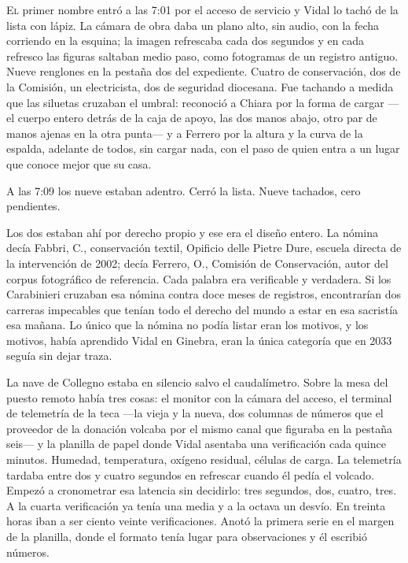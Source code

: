 \lettrine[lines=2, lhang=0.1, nindent=0.2em]{E}{l} primer nombre entró a las 7:01 por el acceso de servicio y Vidal lo tachó de la lista con lápiz. La cámara de obra daba un plano alto, sin audio, con la fecha corriendo en la esquina; la imagen refrescaba cada dos segundos y en cada refresco las figuras saltaban medio paso, como fotogramas de un registro antiguo. Nueve renglones en la pestaña dos del expediente. Cuatro de conservación, dos de la Comisión, un electricista, dos de seguridad diocesana. Fue tachando a medida que las siluetas cruzaban el umbral: reconoció a Chiara por la forma de cargar ---el cuerpo entero detrás de la caja de apoyo, las dos manos abajo, otro par de manos ajenas en la otra punta--- y a Ferrero por la altura y la curva de la espalda, adelante de todos, sin cargar nada, con el paso de quien entra a un lugar que conoce mejor que su casa.


A las 7:09 los nueve estaban adentro. Cerró la lista. Nueve tachados, cero pendientes.

Los dos estaban ahí por derecho propio y ese era el diseño entero. La nómina decía Fabbri, C., conservación textil, Opificio delle Pietre Dure, escuela directa de la intervención de 2002; decía Ferrero, O., Comisión de Conservación, autor del corpus fotográfico de referencia. Cada palabra era verificable y verdadera. Si los Carabinieri cruzaban esa nómina contra doce meses de registros, encontrarían dos carreras impecables que tenían todo el derecho del mundo a estar en esa sacristía esa mañana. Lo único que la nómina no podía listar eran los motivos, y los motivos, había aprendido Vidal en Ginebra, eran la única categoría que en 2033 seguía sin dejar traza.

La nave de Collegno estaba en silencio salvo el caudalímetro. Sobre la mesa del puesto remoto había tres cosas: el monitor con la cámara del acceso, el terminal de telemetría de la teca ---la vieja y la nueva, dos columnas de números que el proveedor de la donación volcaba por el mismo canal que figuraba en la pestaña seis--- y la planilla de papel donde Vidal asentaba una verificación cada quince minutos. Humedad, temperatura, oxígeno residual, células de carga. La telemetría tardaba entre dos y cuatro segundos en refrescar cuando él pedía el volcado. Empezó a cronometrar esa latencia sin decidirlo: tres segundos, dos, cuatro, tres. A la cuarta verificación ya tenía una media y a la octava un desvío. En treinta horas iban a ser ciento veinte verificaciones. Anotó la primera serie en el margen de la planilla, donde el formato tenía lugar para observaciones y él escribió números.

